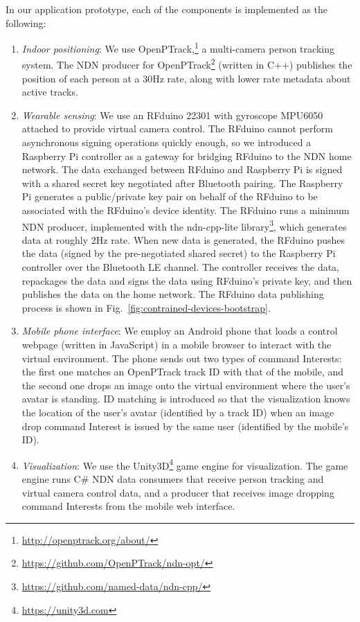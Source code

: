 In our application prototype, each of the components is implemented as the following:
\begin{enumerate}
\item \textit{Indoor positioning}: We use OpenPTrack,\footnote{\url{http://openptrack.org/about/}} a multi-camera person tracking system.
The NDN producer for OpenPTrack\footnote{\url{https://github.com/OpenPTrack/ndn-opt/}} (written in C++)  publishes the position of each person at a 30Hz rate, along with lower rate metadata about active tracks. 
\item \textit{Wearable sensing}: We use an RFduino 22301 with gyroscope MPU6050 attached to provide virtual camera control. 
The RFduino cannot perform asynchronous signing operations quickly enough, so we introduced a Raspberry Pi controller as a gateway for bridging RFduino to the NDN home network.
The data exchanged between RFduino and Raspberry Pi is signed with a shared secret key negotiated after Bluetooth pairing.
The Raspberry Pi generates a public/private key pair on behalf of the RFduino to be associated with the RFduino's device identity.
The RFduino runs a minimum NDN producer, implemented with the ndn-cpp-lite library\footnote{\url{https://github.com/named-data/ndn-cpp/}}, which generates data at roughly 2Hz rate.
When new data is generated, the RFduino pushes the data (signed by the pre-negotiated shared secret) to the Raspberry Pi controller over the Bluetooth LE channel.
The controller receives the data, repackages the data and signs the data using RFduino's private key, and then publishes the data on the home network.
The RFduino data publishing process is shown in Fig.~\ref{fig:contrained-devices-bootstrap}.
\item \textit{Mobile phone interface}: We employ an Android phone that loads a control webpage (written in JavaScript) in a mobile browser to interact with the virtual environment. 
The phone sends out two types of command Interests: the first one matches an OpenPTrack track ID with that of the mobile, and the second one drops an image onto the virtual environment where the user's avatar is standing. ID matching is introduced so that the visualization knows the location of the user's avatar (identified by a track ID) when an image drop command Interest is issued by the same user (identified by the mobile's ID).
\item \textit{Visualization}: We use the Unity3D\footnote{\url{https://unity3d.com}} game engine for visualization.
The game engine runs C\# NDN data consumers that receive person tracking and virtual camera control data, and a producer that receives image dropping command Interests from the mobile web interface.
\end{enumerate}

